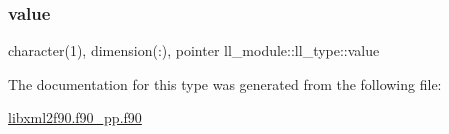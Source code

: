 \subsubsection{\texorpdfstring{value}{value}}
{\footnotesize\ttfamily character(1), dimension(\+:), pointer ll\+\_\+module\+::ll\+\_\+type\+::value}



The documentation for this type was generated from the following file\+:\begin{DoxyCompactItemize}
\item 
\hyperlink{libxml2f90_8f90__pp_8f90}{libxml2f90.\+f90\+\_\+pp.\+f90}\end{DoxyCompactItemize}
